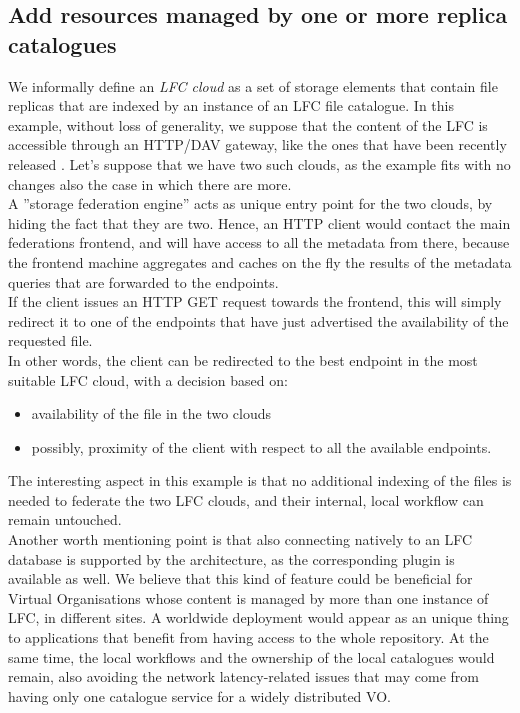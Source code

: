\documentclass[12pt]{article} %
\begin{document}
\subsection{Add resources managed by one or more replica catalogues}

We informally define an \textit{LFC cloud} as a set of storage elements that contain file replicas that are indexed by an instance of an LFC file catalogue. In this example, without loss of generality, we suppose that the content of the LFC is accessible through an HTTP/DAV gateway, like the ones that have been recently released \cite{dpmfuture}.
Let’s suppose that we have two such clouds, as the example fits with no changes also the case in which there are more.\\

A ''storage federation engine'' acts as unique entry point for the two clouds, by hiding the fact that they are two. Hence, an HTTP client would contact the main federations frontend, and will have access to all the metadata from there, because the frontend machine aggregates and caches on the fly the results of the metadata queries that are forwarded to the endpoints.\\
If the client issues an HTTP GET request towards the frontend, this will simply redirect it to one of the endpoints that have just advertised the availability of the requested file.\\ In other words, the client can be redirected to the best endpoint in the most suitable LFC cloud, with a decision based on:
\begin{itemize}
\item availability of the file in the two clouds
\item possibly, proximity of the client with respect to all the available endpoints.
\end{itemize}
The interesting aspect in this example is that no additional indexing of the files is needed to federate the two LFC clouds, and their internal, local workflow can remain untouched. \\
Another worth mentioning point is that also connecting natively to an LFC database is supported by the architecture, as the corresponding plugin is available as well.
We believe that this kind of feature could be beneficial for Virtual Organisations whose content is managed by more than one instance of LFC, in different sites. A worldwide deployment would appear as an unique thing to applications that benefit from having access to the whole repository. At the same time, the local workflows and the ownership of the local catalogues would remain, also avoiding the network latency-related issues that may come from having only one catalogue service for a widely distributed VO.
\end{document}
